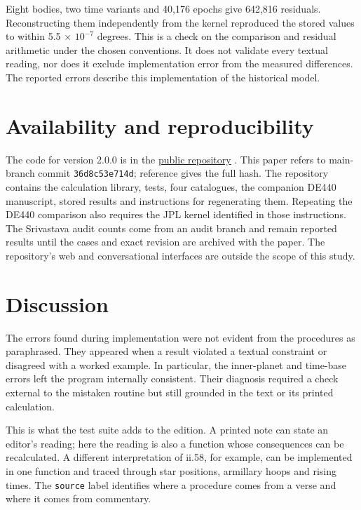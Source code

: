 \documentclass[11pt,a4paper]{article}
\begin{document}
Eight bodies, two time variants and 40,176 epochs give 642,816 residuals. Reconstructing them independently from the kernel reproduced the stored values to within 5.5 $\times$ $10^{-7}$ degrees. This is a check on the comparison and residual arithmetic under the chosen conventions. It does not validate every textual reading, nor does it exclude implementation error from the measured differences. The reported errors describe this implementation of the historical model.

\section{Availability and reproducibility}
\label{sec:availability}

The code for version 2.0.0 is in the \href{https://github.com/mrashutoshnigam/surya-siddhanta}{public repository} \citep{nigam2026software}. This paper refers to main-branch commit \texttt{36d8c53e714d}; reference \citep{nigam2026software} gives the full hash. The repository contains the calculation library, tests, four catalogues, the companion DE440 manuscript, stored results and instructions for regenerating them. Repeating the DE440 comparison also requires the JPL kernel identified in those instructions. The Srivastava audit counts come from an audit branch and remain reported results until the cases and exact revision are archived with the paper. The repository's web and conversational interfaces are outside the scope of this study.

\section{Discussion}
\label{sec:discussion}

The errors found during implementation were not evident from the procedures as paraphrased. They appeared when a result violated a textual constraint or disagreed with a worked example. In particular, the inner-planet and time-base errors left the program internally consistent. Their diagnosis required a check external to the mistaken routine but still grounded in the text or its printed calculation.

This is what the test suite adds to the edition. A printed note can state an editor's reading; here the reading is also a function whose consequences can be recalculated. A different interpretation of ii.58, for example, can be implemented in one function and traced through star positions, armillary hoops and rising times. The \texttt{source} label identifies where a procedure comes from a verse and where it comes from commentary.
\end{document}

